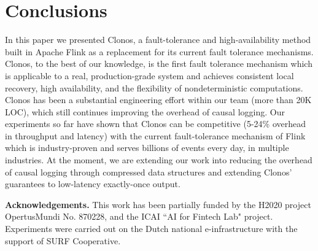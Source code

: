 \documentclass[sigconf]{acmart}
\newcommand{\para}[1]{\vspace{1mm}\noindent\textbf{#1.}}
\begin{document}
\section{Conclusions}
\label{sec:conclusions}

In this paper we presented Clonos, a fault-tolerance and high-availability method built in Apache Flink as a replacement for its current fault tolerance mechanisms. Clonos, to the best of our knowledge, is the first fault tolerance mechanism which is applicable to a real, production-grade system and achieves consistent local recovery, high availability, and the flexibility of nondeterministic computations. Clonos has been a substantial engineering effort within our team (more than 20K LOC), which still continues improving the overhead of causal logging. Our experiments so far have shown that Clonos can be competitive (5-24\% overhead in throughput and latency) with the current fault-tolerance mechanism of Flink which is industry-proven and serves billions of events every day, in multiple industries. 
At the moment, we are extending our work into reducing the overhead of causal logging through compressed data structures and extending Clonos' guarantees to low-latency exactly-once output.


\para{Acknowledgements} This work has been partially funded by the H2020 project OpertusMundi No. 870228, and the ICAI ``AI for Fintech Lab" project. Experiments were carried out on the Dutch national e-infrastructure with the support of SURF Cooperative.



\balance

  
  
  
  

\balance
  
  
\end{document}

